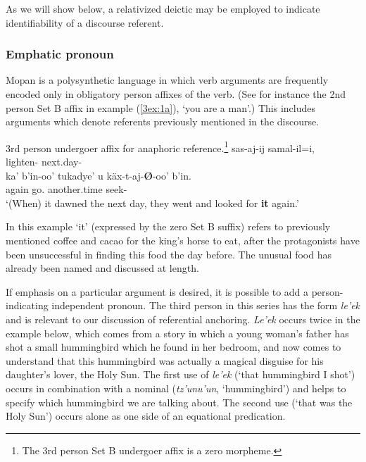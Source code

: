 \documentclass[output=paper]{langsci/langscibook}
\begin{document}
As we will show below, a relativized deictic may be employed to indicate identifiability of a discourse referent.

\subsubsection{Emphatic pronoun}\label{3sec:212}

Mopan is a polysynthetic language in which verb arguments are frequently encoded only in obligatory person affixes of the verb.  (See for instance the 2nd person Set B affix in example (\ref{3ex:1a}), `you are a man'.) This includes arguments which denote referents previously mentioned in the discourse.

\begin{exe}
\ex\label{3ex:5}
3rd person undergoer affix for anaphoric reference.\footnote{The 3rd person Set B undergoer affix is a zero morpheme.} 
\exi{}
\gll	sas-aj-ij 					samal-il=i, \\
	lighten-{}	next.day-{} \\
\glt
\exi{}
\gll	ka' 		b'in-oo'			tukadye' 		u 		k\"ax-t-aj-{\bf{\O}}-oo' 		b'in.	\\
	again	go.{}	another.time	{}	seek-{}	{} \\
\glt	`(When) it dawned the next day, they went and looked for {\bf{it}} again.'
\end{exe}

In this example `it' (expressed by the zero Set B suffix) refers to previously mentioned coffee and cacao for the king's horse to eat, after the protagonists have been unsuccessful in finding this food the day before. The unusual food has already been named and discussed at length.

If emphasis on a particular argument is desired, it is possible to add a person-indicating independent pronoun. The third person in this series has the form {\emph{le'ek}} and is relevant to our discussion of referential anchoring. {\emph{Le'ek}} occurs twice in the example below, which comes from a story in which a young woman's father has shot a small hummingbird which he found in her bedroom, and now comes to understand that this hummingbird was actually a magical disguise for his daughter's lover, the Holy Sun. The first use of {\emph{le'ek}} (`that hummingbird I shot') occurs in combination with a nominal ({\emph{tz'unu'un}}, `hummingbird') and helps to specify which hummingbird we are talking about. The second use (`that was the Holy Sun') occurs alone as one side of an equational predication.
\end{document}
